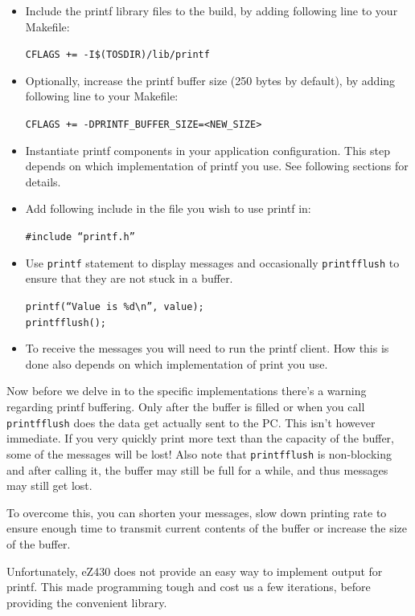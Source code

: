 \begin{itemize}
  \item Include the printf library files to the build, by adding
    following line to your Makefile:

    \texttt{CFLAGS += -I\$(TOSDIR)/lib/printf}

  \item Optionally, increase the printf buffer size (250 bytes by
    default), by adding following line to your Makefile:

    \texttt{CFLAGS += -DPRINTF\_BUFFER\_SIZE=<NEW\_SIZE>}

  \item Instantiate printf components in your application
    configuration. This step depends on which implementation of
    printf you use. See following sections for details.

  \item Add following include in the file you wish to use printf in:

    \texttt{\#include ``printf.h''}

  \item Use \texttt{printf} statement to display messages and
    occasionally \texttt{printfflush} to ensure that they are not stuck
    in a buffer.

    \texttt{printf(``Value is \%d\textbackslash n'', value);} \\
    \texttt{printfflush();}

  \item To receive the messages you will need to run the printf
    client. How this is done also depends on which implementation of
    print you use.
\end{itemize}

Now before we delve in to the specific implementations there's a warning
regarding printf buffering. Only after the buffer is filled or when
you call \texttt{printfflush} does the data get actually sent to the
PC. This isn't however immediate. If you very quickly print more text
than the capacity of the buffer, some of the messages will be lost!
Also note that \texttt{printfflush} is non-blocking and after calling
it, the buffer may still be full for a while, and thus messages
may still get lost.

To overcome this,  you can shorten your messages, slow down printing
rate to ensure enough time to transmit current contents of the buffer
or increase the size of the buffer.

Unfortunately, eZ430 does not provide an easy way to implement output for printf.
This made programming tough and cost us a few iterations, before providing the convenient library.

